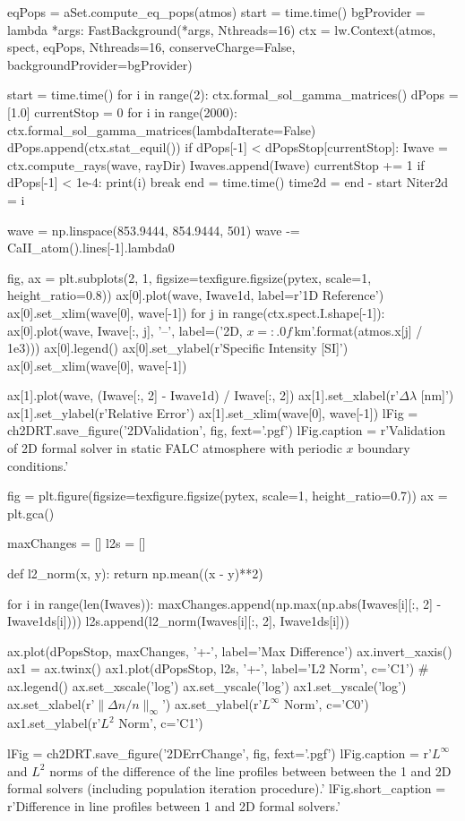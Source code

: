 \begin{pycode}[2DValidation]
eqPops = aSet.compute_eq_pops(atmos)
start = time.time()
bgProvider = lambda *args: FastBackground(*args, Nthreads=16)
ctx = lw.Context(atmos, spect, eqPops, Nthreads=16, conserveCharge=False, backgroundProvider=bgProvider)

start = time.time()
for i in range(2):
    ctx.formal_sol_gamma_matrices()
dPops = [1.0]
currentStop = 0
for i in range(2000):
    ctx.formal_sol_gamma_matrices(lambdaIterate=False)
    dPops.append(ctx.stat_equil())
    if dPops[-1] < dPopsStop[currentStop]:
        Iwave = ctx.compute_rays(wave, rayDir)
        Iwaves.append(Iwave)
        currentStop += 1
    if dPops[-1] < 1e-4:
        print(i)
        break
end = time.time()
time2d = end - start
Niter2d = i

wave = np.linspace(853.9444, 854.9444, 501)
wave -= CaII_atom().lines[-1].lambda0
\end{pycode}

\begin{pycode}[2DValidation]
fig, ax = plt.subplots(2, 1, figsize=texfigure.figsize(pytex, scale=1, height_ratio=0.8))
ax[0].plot(wave, Iwave1d, label=r'1D Reference')
ax[0].set_xlim(wave[0], wave[-1])
for j in range(ctx.spect.I.shape[-1]):
    ax[0].plot(wave, Iwave[:, j], '--', label=('2D, $x={:.0f}$\,\si{{\kilo\metre}}'.format(atmos.x[j] / 1e3)))
ax[0].legend()
ax[0].set_ylabel(r'Specific Intensity [SI]')
ax[0].set_xlim(wave[0], wave[-1])

ax[1].plot(wave, (Iwave[:, 2] - Iwave1d) / Iwave[:, 2])
ax[1].set_xlabel(r'$\Delta\lambda$ [\si{\nano\metre}]')
ax[1].set_ylabel(r'Relative Error')
ax[1].set_xlim(wave[0], wave[-1])
lFig = ch2DRT.save_figure('2DValidation', fig, fext='.pgf')
lFig.caption = r'Validation of 2D formal solver in static FALC atmosphere with periodic $x$ boundary conditions.'
\end{pycode}

\begin{pycode}[2DValidation]
fig = plt.figure(figsize=texfigure.figsize(pytex, scale=1, height_ratio=0.7))
ax = plt.gca()

maxChanges = []
l2s = []

def l2_norm(x, y):
    return np.mean((x - y)**2)

for i in range(len(Iwaves)):
    maxChanges.append(np.max(np.abs(Iwaves[i][:, 2] - Iwave1ds[i])))
    l2s.append(l2_norm(Iwaves[i][:, 2], Iwave1ds[i]))

ax.plot(dPopsStop, maxChanges, '+-', label='Max Difference')
ax.invert_xaxis()
ax1 = ax.twinx()
ax1.plot(dPopsStop, l2s, '+-', label='L2 Norm', c='C1')
# ax.legend()
ax.set_xscale('log')
ax.set_yscale('log')
ax1.set_yscale('log')
ax.set_xlabel(r'$\|\Delta n / n\|_\infty$')
ax.set_ylabel(r'$L^\infty$ Norm', c='C0')
ax1.set_ylabel(r'$L^2$ Norm', c='C1')

lFig = ch2DRT.save_figure('2DErrChange', fig, fext='.pgf')
lFig.caption = r'$L^\infty$ and $L^2$ norms of the difference of the \CaLine{} line profiles between between the 1 and 2D formal solvers (including population iteration procedure).'
lFig.short_caption = r'Difference in \CaLine{} line profiles between 1 and 2D formal solvers.'
\end{pycode}

